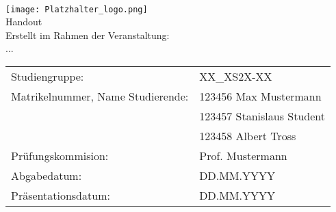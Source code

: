 \begin{center}
     \\[3ex]
    \texttt{[image: Platzhalter\_logo.png]} \\[3ex]%
    \large{Handout} \\ [-10pt]
    \large{Erstellt im Rahmen der Veranstaltung:} \\ [-10pt]
    \large{...}
\end{center}

\renewcommand{\arraystretch}{2.5}
\begin{table}[h]
    \setlength{\tabcolsep}{22pt}
    \begin{tabularx}{\textwidth}{l l}
        Studiengruppe:                      & XX\_XS2X-XX               \\
        Matrikelnummer, Name Studierende:   & 123456 Max Mustermann     \\ [-15pt]
        ~                                   & 123457 Stanislaus Student \\ [-15pt]
        ~                                   & 123458 Albert Tross       \\
        Prüfungskommision:                  & Prof. Mustermann          \\
        Abgabedatum:                        & DD.MM.YYYY                \\ [-15pt]
        Präsentationsdatum:                 & DD.MM.YYYY                \\
    \end{tabularx}
\end{table}

\newpage